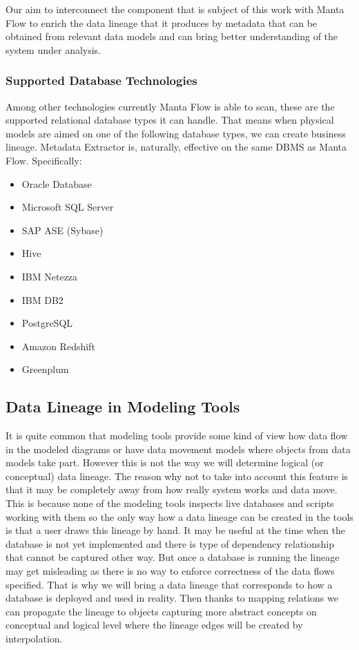 Our aim to interconnect the component that is subject of this work with Manta Flow to enrich the data lineage that it produces by metadata that can be obtained from relevant data models and can bring better understanding of the system under analysis.

\subsubsection{Supported Database Technologies}
Among other technologies currently Manta Flow is able to scan, these are the supported relational database types it can handle. 
That means when physical models are aimed on one of the following database types, we can create business lineage. Metadata Extractor is, naturally, effective on the same DBMS as Manta Flow. Specifically:
\begin{itemize}
	\item Oracle Database
	\item Microsoft SQL Server
	\item SAP ASE (Sybase)
	\item Hive
	\item IBM Netezza
	\item IBM DB2
	\item PostgreSQL
	\item Amazon Redshift
	\item Greenplum
\end{itemize}

\subsection{Data Lineage in Modeling Tools}

It is quite common that modeling tools provide some kind of view how data flow in the modeled diagrams or have data movement models where objects from data models take part. 
However this is not the way we will determine logical (or conceptual) data lineage.
The reason why not to take into account this feature is that it may be completely away from how really system works and data move. This is because none of the modeling tools inspects live databases and scripts working with them so the only way how a data lineage can be created in the tools is that a user draws this lineage by hand. 
It may be useful at the time when the database is not yet implemented and there is type of dependency relationship that cannot be captured other way. But once a database is running the lineage may get misleading as there is no way to enforce correctness of the data flows specified.
That is why we will bring a data lineage that corresponds to how a database is deployed and used in reality. Then thanks to mapping relations we can propagate the lineage to objects capturing more abstract concepts on conceptual and logical level where the lineage edges will be created by interpolation.